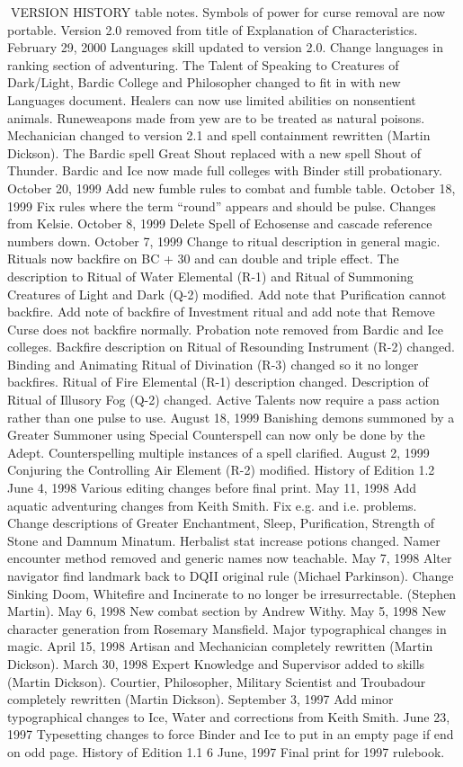 \documentclass[a4paper]{article}
\begin{document}
\begin{multicols}{3}
VERSION HISTORY
table notes. Symbols of power for curse removal
are now portable. Version 2.0 removed from title
of Explanation of Characteristics.
February 29, 2000 Languages skill updated to
version 2.0. Change languages in ranking section
of adventuring. The Talent of Speaking to Creatures of Dark/Light, Bardic College and Philosopher changed to fit in with new Languages document. Healers can now use limited abilities on nonsentient animals. Runeweapons made from yew are
to be treated as natural poisons. Mechanician
changed to version 2.1 and spell containment rewritten (Martin Dickson).
The Bardic spell Great Shout replaced with a new
spell Shout of Thunder. Bardic and Ice now made
full colleges with Binder still probationary.
October 20, 1999 Add new fumble rules to combat
and fumble table.
October 18, 1999 Fix rules where the term “round”
appears and should be pulse. Changes from Kelsie.
October 8, 1999 Delete Spell of Echosense and
cascade reference numbers down.
October 7, 1999 Change to ritual description in
general magic. Rituals now backfire on BC + 30%
and can double and triple effect. The description to
Ritual of Water Elemental (R-1) and Ritual of
Summoning Creatures of Light and Dark (Q-2)
modified. Add note that Purification cannot backfire. Add note of backfire of Investment ritual and
add note that Remove Curse does not backfire
normally. Probation note removed from Bardic and
Ice colleges. Backfire description on Ritual of
Resounding Instrument (R-2) changed. Binding
and Animating Ritual of Divination (R-3) changed
so it no longer backfires. Ritual of Fire Elemental
(R-1) description changed. Description of Ritual of
Illusory Fog (Q-2) changed. Active Talents now
require a pass action rather than one pulse to use.
August 18, 1999 Banishing demons summoned by
a Greater Summoner using Special Counterspell
can now only be done by the Adept. Counterspelling multiple instances of a spell clarified.
August 2, 1999 Conjuring the Controlling Air
Element (R-2) modified.
History of Edition 1.2
June 4, 1998 Various editing changes before final
print.
May 11, 1998 Add aquatic adventuring changes
from Keith Smith. Fix e.g. and i.e. problems.
Change descriptions of Greater Enchantment,
Sleep, Purification, Strength of Stone and Damnum
Minatum. Herbalist stat increase potions changed.
Namer encounter method removed and generic
names now teachable.
May 7, 1998 Alter navigator find landmark back to
DQII original rule (Michael Parkinson). Change
Sinking Doom, Whitefire and Incinerate to no
longer be irresurrectable. (Stephen Martin).
May 6, 1998 New combat section by Andrew
Withy.
May 5, 1998 New character generation from
Rosemary Mansfield. Major typographical changes
in magic.
April 15, 1998 Artisan and Mechanician completely rewritten (Martin Dickson).
March 30, 1998 Expert Knowledge and Supervisor
added to skills (Martin Dickson). Courtier, Philosopher, Military Scientist and Troubadour completely rewritten (Martin Dickson).
September 3, 1997 Add minor typographical
changes to Ice, Water and corrections from Keith
Smith.
June 23, 1997 Typesetting changes to force Binder
and Ice to put in an empty page if end on odd page.
History of Edition 1.1
6 June, 1997 Final print for 1997 rulebook.


\end{multicols}
\end{document}
